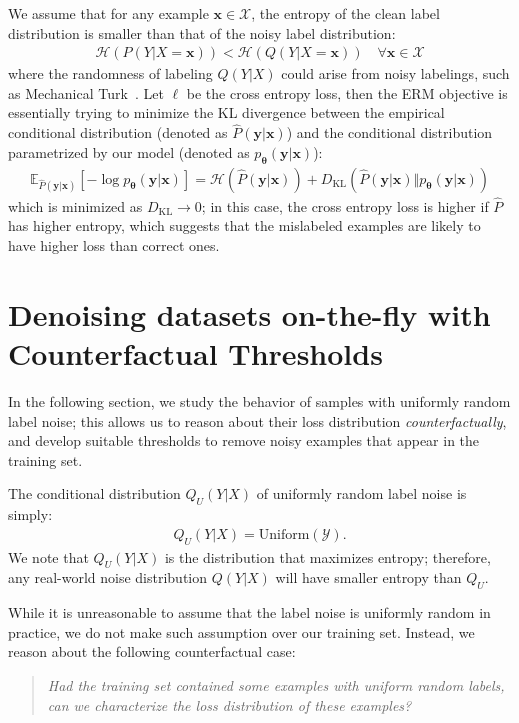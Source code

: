 \documentclass[a4paper,11pt]{article}
\newcommand{\bb}[1]{\mathbb{#1}}
\def\vtheta{{\bm{\theta}}}
\def\vx{{\bm{x}}}
\def\vy{{\bm{y}}}
\def\gH{{\mathcal{H}}}
\def\gX{{\mathcal{X}}}
\def\gY{{\mathcal{Y}}}
\newcommand{\KL}{D_{\mathrm{KL}}}
\begin{document}
We assume that for any example $\vx \in \gX$, the entropy of the clean label distribution is smaller than that of the noisy label distribution:
\begin{align}
    \gH(P(Y | X = \vx)) < \gH(Q(Y | X = \vx)) \quad \forall \vx \in \gX
\end{align}
where the randomness of labeling $Q(Y | X)$ could arise from noisy labelings, such as Mechanical Turk~\cite{krishna2016embracing}.
Let $\ell$ be the cross entropy loss, then the ERM objective is essentially trying to minimize the KL divergence between the empirical conditional distribution (denoted as $\hat{P}(\vy | \vx)$) and the conditional distribution parametrized by our model (denoted as $p_\vtheta(\vy | \vx)$):
\begin{align}
    \bb{E}_{\hat{P}(\vy | \vx)} [-\log p_\vtheta(\vy | \vx)] = \gH(\hat{P}(\vy |\vx)) + \KL(\hat{P}(\vy | \vx) \Vert p_\vtheta(\vy | \vx))
\end{align}
which is minimized as $\KL \to 0$; in this case, the cross entropy loss is higher if $\hat{P}$ has higher entropy, which suggests that the mislabeled examples are likely to have higher loss than correct ones.

\section{Denoising datasets on-the-fly with Counterfactual Thresholds}
In the following section, we study the behavior of samples with uniformly random label noise; this allows us to reason about their loss distribution \textit{counterfactually}, and develop suitable thresholds to remove noisy examples that appear in the training set. 

The conditional distribution $Q_U(Y|X)$ of uniformly random label noise is simply:
\begin{align}
    Q_U(Y|X) = \mathrm{Uniform}(\gY).
\end{align}
We note that $Q_U(Y|X)$ is the distribution that maximizes entropy; therefore, any real-world noise distribution $Q(Y|X)$ will have smaller entropy than $Q_U$. 

While it is unreasonable to assume that the label noise is uniformly random in practice, we do not make such assumption over our training set. Instead, we reason about the following counterfactual case: 
\begin{quote}
    \textit{Had the training set contained some examples with uniform random labels, can we characterize the loss distribution of these examples?}
\end{quote}
\end{document}

